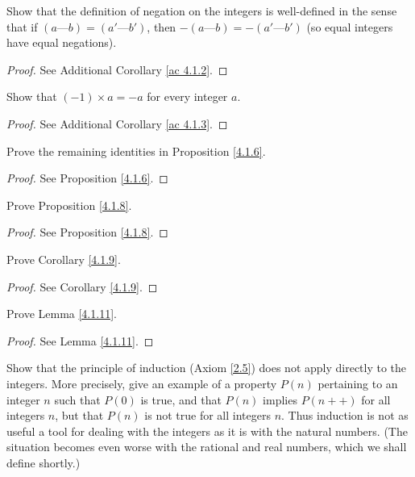 \begin{exercise}\label{ex 4.1.2}
    Show that the definition of negation on the integers is well-defined in the sense that if \((a \text{---} b) = (a' \text{---} b')\), then \(-(a \text{---} b) = -(a' \text{---} b')\)
    (so equal integers have equal negations).
\end{exercise}

\begin{proof}
    See Additional Corollary \ref{ac 4.1.2}.
\end{proof}

\begin{exercise}\label{ex 4.1.3}
    Show that \((-1) \times a = -a\) for every integer \(a\).
\end{exercise}

\begin{proof}
    See Additional Corollary \ref{ac 4.1.3}.
\end{proof}

\begin{exercise}\label{ex 4.1.4}
    Prove the remaining identities in Proposition \ref{4.1.6}.
\end{exercise}

\begin{proof}
    See Proposition \ref{4.1.6}.
\end{proof}

\begin{exercise}\label{ex 4.1.5}
    Prove Proposition \ref{4.1.8}.
\end{exercise}

\begin{proof}
    See Proposition \ref{4.1.8}.
\end{proof}

\begin{exercise}\label{ex 4.1.6}
    Prove Corollary \ref{4.1.9}.
\end{exercise}

\begin{proof}
    See Corollary \ref{4.1.9}.
\end{proof}

\begin{exercise}\label{ex 4.1.7}
    Prove Lemma \ref{4.1.11}.
\end{exercise}

\begin{proof}
    See Lemma \ref{4.1.11}.
\end{proof}

\begin{exercise}\label{ex 4.1.8}
    Show that the principle of induction (Axiom \ref{2.5}) does not apply directly to the integers.
    More precisely, give an example of a property \(P(n)\) pertaining to an integer \(n\) such that \(P(0)\) is true, and that \(P(n)\) implies \(P(n++)\) for all integers \(n\), but that \(P(n)\) is not true for all integers \(n\).
    Thus induction is not as useful a tool for dealing with the integers as it is with the natural numbers.
    (The situation becomes even worse with the rational and real numbers, which we shall define shortly.)
\end{exercise}

